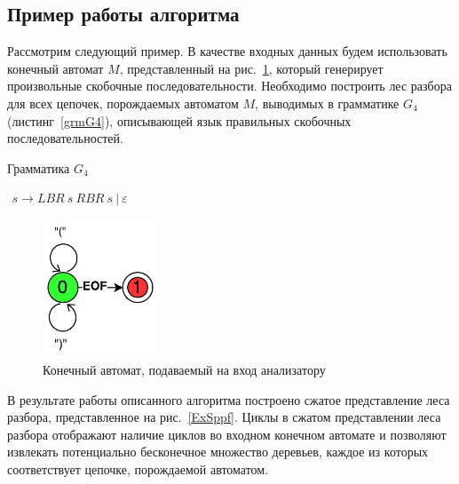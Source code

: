 \subsection{Пример работы алгоритма}
Рассмотрим следующий пример. В качестве входных данных будем использовать конечный автомат $M$, представленный на рис.~\ref{InputGraph}, который генерирует произвольные скобочные последовательности. Необходимо построить лес разбора для всех цепочек, порождаемых автоматом $M$, выводимых в грамматике $G_4$ (листинг~\ref{grmG4}), описывающей язык правильных скобочных последовательностей.
\begin{listing}
\caption{Грамматика $G_4$}
\label{grmG4}
\centering
$\begin{array}{rl}
s \rightarrow LBR \ s \ RBR \ s \  | \ \varepsilon 
\end{array}$
\end{listing}

\begin{figure}
 \centering
 \includegraphics[width=0.3\textwidth]{Ragozina/pics/ExampleInputGraph.pdf}
 \caption{Конечный автомат, подаваемый на вход анализатору }
 \label{InputGraph}
\end{figure}

В результате работы описанного алгоритма построено сжатое представление леса разбора, представленное на рис.~\ref{ExSppf}. Циклы в сжатом представлении леса разбора отображают наличие циклов во входном конечном автомате и позволяют извлекать потенциально бесконечное множество деревьев, каждое из которых соответствует цепочке, порождаемой автоматом.


